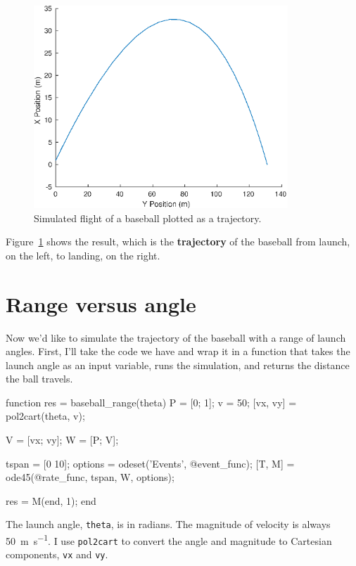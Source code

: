 \documentclass[
]{book}
\numberwithin{Answer}{chapter}
\numberwithin{Exercise}{chapter}
\begin{document}
\begin{figure}
\centerline{\includegraphics[height=3in]{figs/baseball3.eps}}
\caption{Simulated flight of a baseball plotted as a trajectory.}
\label{fig:baseball3}
\end{figure}

Figure~\ref{fig:baseball3} shows the result, which is the {\bf trajectory} of the baseball from launch, on the left, to landing, on the right.


\section{Range versus angle}

Now we'd like to simulate the trajectory of the baseball with a range of launch angles.  First, I'll take the code we have and wrap it in a function that takes the launch angle as an input variable, runs the simulation, and returns the distance the ball travels.

\begin{code}
function res = baseball_range(theta)
    P = [0; 1];       
    v = 50;           
    [vx, vy] = pol2cart(theta, v);
    
    V = [vx; vy];     %
    W = [P; V];       %
    
    tspan = [0 10];
    options = odeset('Events', @event_func);
    [T, M] = ode45(@rate_func, tspan, W, options);
    
    res = M(end, 1);
end
\end{code}

The launch angle, {\tt theta}, is in radians.  The magnitude of velocity is always \SI{50}{\meter\per\second}.  I use {\tt pol2cart} to convert the angle and magnitude to Cartesian components, {\tt vx} and {\tt vy}.
\end{document}
